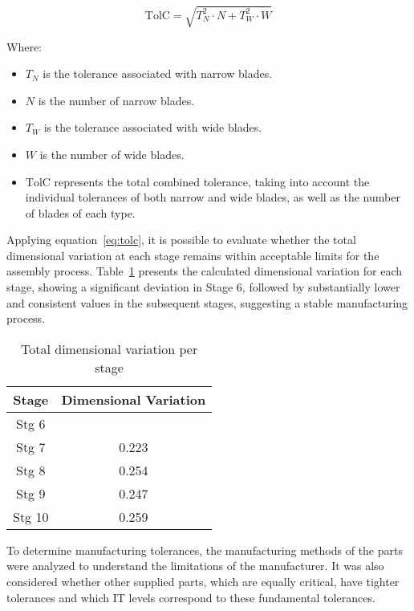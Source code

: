 \begin{equation}
\text{TolC} = \sqrt{T_N^2 \cdot N + T_W^2 \cdot W}
\end{equation}

Where:
\begin{itemize}
    \label{eq:tolc}
    \item \( T_N \) is the tolerance associated with narrow blades.
    \item \( N \) is the number of narrow blades.
    \item \( T_W \) is the tolerance associated with wide blades.
    \item \( W \) is the number of wide blades.
    \item \( \text{TolC} \) represents the total combined tolerance, taking into account the individual tolerances of both narrow and wide blades, as well as the number of blades of each type.
\end{itemize}

Applying equation~\ref{eq:tolc}, it is possible to evaluate whether the total dimensional variation at each stage remains within acceptable limits for the assembly process. 
Table~\ref{tab:dimensional variation} presents the calculated dimensional variation for each stage, showing a significant deviation in Stage 6, followed by substantially lower and consistent values in the subsequent stages, suggesting a stable manufacturing process.

\begin{table}[H]
    \centering
    \caption{Total dimensional variation per stage}
    \label{tab:dimensional variation}
    \begin{tabular}{cc}
        \hline
        \textbf{Stage} & \textbf{Dimensional Variation} \\
        \hline
        Stg 6 &         \\
        Stg 7 &  0.223  \\
        Stg 8 & 0.254   \\
        Stg 9 & 0.247   \\
        Stg 10 & 0.259  \\
        \hline
    \end{tabular}
\end{table}



To determine manufacturing tolerances, the manufacturing methods of the parts were analyzed to understand the limitations of the manufacturer. 
It was also considered whether other supplied parts, which are equally critical, have tighter tolerances and which IT levels correspond to these fundamental tolerances.

